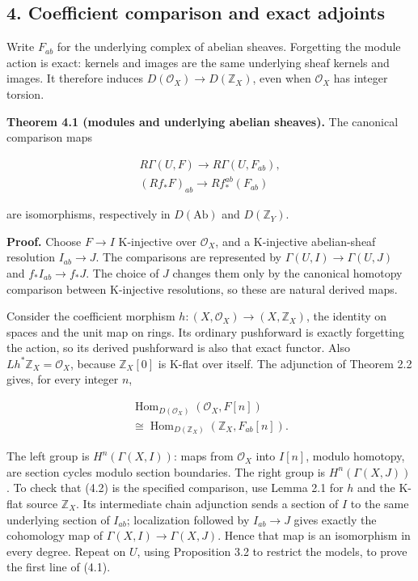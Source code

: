 \documentclass[
  english,
  11pt,
  a4paper,
]{article}
\begin{document}
\subsection{4. Coefficient comparison and exact
adjoints}\label{derived-pullback-and-pushforward--4-coefficient-comparison-and-exact-adjoints}

Write \(F_{ab}\) for the underlying complex of abelian sheaves.
Forgetting the module action is exact: kernels and images are the same
underlying sheaf kernels and images. It therefore induces
\(D(\mathcal O_X)\to D(\mathbb Z_X)\), even when \(\mathcal O_X\) has
integer torsion.

\textbf{Theorem 4.1 (modules and underlying abelian sheaves).} The
canonical comparison maps

\[\begin{gathered}
R\Gamma(U,F)\longrightarrow R\Gamma(U,F_{ab}),\\
(Rf_*F)_{ab}\longrightarrow Rf_*^{ab}(F_{ab})
\end{gathered}
\tag{4.1}\]

are isomorphisms, respectively in \(D(\mathrm{Ab})\) and
\(D(\mathbb Z_Y)\).

\textbf{Proof.} Choose \(F\to I\) K-injective over \(\mathcal O_X\), and
a K-injective abelian-sheaf resolution \(I_{ab}\to J\). The comparisons
are represented by \(\Gamma(U,I)\to\Gamma(U,J)\) and
\(f_*I_{ab}\to f_*J\). The choice of \(J\) changes them only by the
canonical homotopy comparison between K-injective resolutions, so these
are natural derived maps.

Consider the coefficient morphism
\(h:(X,\mathcal O_X)\to(X,\mathbb Z_X)\), the identity on spaces and the
unit map on rings. Its ordinary pushforward is exactly forgetting the
action, so its derived pushforward is also that exact functor. Also
\(Lh^*\mathbb Z_X=\mathcal O_X\), because \(\mathbb Z_X[0]\) is K-flat
over itself. The adjunction of Theorem 2.2 gives, for every integer
\(n\),

\[\begin{gathered}
\operatorname{Hom}_{D(\mathcal O_X)}(\mathcal O_X,F[n])
\\ \cong\operatorname{Hom}_{D(\mathbb Z_X)}(\mathbb Z_X,F_{ab}[n]).
\end{gathered}
\tag{4.2}\]

The left group is \(H^n(\Gamma(X,I))\): maps from \(\mathcal O_X\) into
\(I[n]\), modulo homotopy, are section cycles modulo section boundaries.
The right group is \(H^n(\Gamma(X,J))\). To check that (4.2) is the
specified comparison, use Lemma 2.1 for \(h\) and the K-flat source
\(\mathbb Z_X\). Its intermediate chain adjunction sends a section of
\(I\) to the same underlying section of \(I_{ab}\); localization
followed by \(I_{ab}\to J\) gives exactly the cohomology map of
\(\Gamma(X,I)\to\Gamma(X,J)\). Hence that map is an isomorphism in every
degree. Repeat on \(U\), using Proposition 3.2 to restrict the models,
to prove the first line of (4.1).
\end{document}

